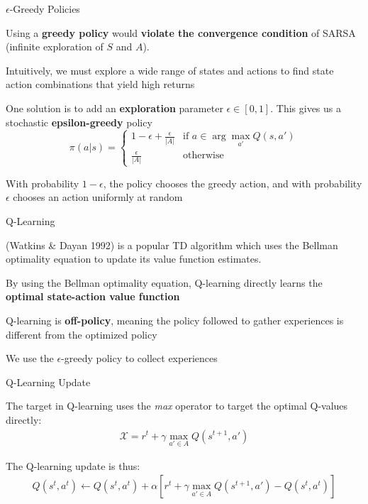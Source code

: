 \begin{frame}{$\epsilon$-Greedy Policies}

    Using a \textbf{greedy policy} would \textbf{violate the convergence condition} of SARSA (infinite exploration of $S$ and $A$). 
    \vspace{0pt}
    \blist
        \item Intuitively, we must explore a wide range of states and actions to find state action combinations that yield high returns
        
        \item One solution is to add an \textbf{exploration} parameter $\epsilon \in [0, 1]$. This gives us a stochastic \textbf{epsilon-greedy} policy
    $$
        \pi(a|s) = \begin{cases} 
        1 - \epsilon + \frac{\epsilon}{|A|} & \text{if } a \in \arg\max_{a'} Q(s, a') \\
        \frac{\epsilon}{|A|} & \text{otherwise} 
    \end{cases}
    $$
    
        \item With probability $1-\epsilon$, the policy chooses the greedy action, and with probability $\epsilon$ chooses an action uniformly at random
    \elist
    
\end{frame}

\begin{frame}{Q-Learning}

     (Watkins \& Dayan 1992) is a popular TD algorithm which uses the Bellman optimality equation to update its value function estimates.
    \vspace{10pt}
    \blist
        \item By using the Bellman optimality equation, Q-learning directly learns the \textbf{optimal state-action value function}
        \item Q-learning is \textbf{off-policy}, meaning the policy followed to gather experiences is different from the optimized policy
        \item We use the $\epsilon$-greedy policy to collect experiences
    \elist

\end{frame}

\begin{frame}{Q-Learning Update}

    The target in Q-learning uses the \textit{max} operator to target the optimal Q-values directly:
    \begin{align*}
        \mathcal{X} = r^{t} + \gamma \max_{a' \in A}Q(s^{t+1}, a')
    \end{align*}

    The Q-learning update is thus:
    \begin{align*}
        Q(s^t, a^t) \gets Q(s^t, a^t) + \alpha \left[ r^t + \gamma \max_{a' \in A} Q(s^{t+1}, a') - Q(s^t, a^t) \right]
    \end{align*}
    
\end{frame}

